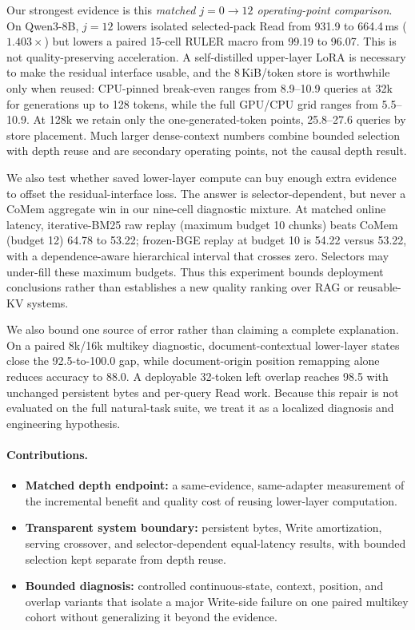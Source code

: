 Our strongest evidence is this \emph{matched $j{=}0\!\rightarrow\!12$
operating-point comparison}. On
Qwen3-8B, $j{=}12$ lowers isolated selected-pack Read from 931.9 to 664.4\,ms
($1.403\times$) but lowers a paired 15-cell RULER macro from 99.19 to 96.07.
This is not quality-preserving acceleration. A self-distilled upper-layer LoRA
is necessary to make the residual interface usable, and the 8\,KiB/token store
is worthwhile only when reused: CPU-pinned break-even ranges from 8.9--10.9
queries at 32k for generations up to 128 tokens, while the full GPU/CPU grid
ranges from 5.5--10.9. At 128k we retain only the one-generated-token points,
25.8--27.6 queries by store placement. Much larger dense-context numbers combine bounded
selection with depth reuse and are secondary operating points, not the causal
depth result.

We also test whether saved lower-layer compute can buy enough extra evidence to
offset the residual-interface loss. The answer is selector-dependent, but never
a CoMem aggregate win in our nine-cell diagnostic mixture. At matched online
latency, iterative-BM25 raw replay (maximum budget 10 chunks) beats CoMem
(budget 12) 64.78 to 53.22; frozen-BGE replay at budget 10 is 54.22 versus
53.22, with a dependence-aware hierarchical interval that crosses zero.
Selectors may under-fill these maximum budgets.
Thus this experiment bounds deployment conclusions rather than establishes a
new quality ranking over RAG or reusable-KV systems.

We also bound one source of error rather than claiming a complete explanation.
On a paired 8k/16k multikey diagnostic, document-contextual lower-layer states
close the 92.5-to-100.0 gap, while document-origin position remapping alone
reduces accuracy to 88.0. A deployable 32-token left overlap reaches 98.5 with
unchanged persistent bytes and per-query Read work. Because this repair is not
evaluated on the full natural-task suite, we treat it as a localized diagnosis
and engineering hypothesis.

\paragraph{Contributions.}
\begin{itemize}[leftmargin=1.2em,itemsep=1pt,topsep=2pt]
\item \textbf{Matched depth endpoint:} a same-evidence, same-adapter measurement of
the incremental benefit and quality cost of reusing lower-layer computation.
\item \textbf{Transparent system boundary:} persistent bytes, Write
amortization, serving crossover, and selector-dependent equal-latency results, with
bounded selection kept separate from depth reuse.
\item \textbf{Bounded diagnosis:} controlled continuous-state, context,
position, and overlap variants that isolate a major Write-side failure on one
paired multikey cohort without generalizing it beyond the evidence.
\end{itemize}
